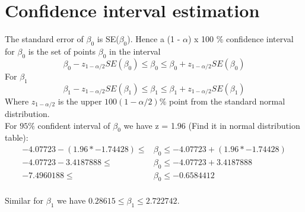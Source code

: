 \documentclass{article}
\begin{document}
    
\section {Confidence interval estimation}
    The standard error of $\beta_{0}$ is SE($\beta_{0}$). Hence a (1 - $\alpha$) x 100 $\%$ confidence interval for $\beta_{0}$  is the set of points $\beta_{0}$ in the interval
    \begin{equation} 
        \beta_{0} - z_{1 - \alpha/2}SE(\beta_{0}) \le \beta_{0} \le \beta_{0} + z_{1 - \alpha/2}SE(\beta_{0})
    \end{equation}
    For $\beta_{1}$
    \begin{equation} 
        \beta_{1} - z_{1 - \alpha/2}SE(\beta_{1}) \le \beta_{1} \le \beta_{1} + z_{1 - \alpha/2}SE(\beta_{1})
    \end{equation}
    Where $z_{1 - \alpha / 2}$ is the upper $100 \left(1 - \alpha / 2 \right)\%$ point from the standard normal distribution. 
    \\
    For $95\%$ confident interval of $\beta_{0}$ we have z = 1.96 (Find it in normal distribution table): 
    \begin{align} 
        -4.07723 - (1.96 * -1.74428) \le&\beta_{0}\le -4.07723 + (1.96 * -1.74428)
        \nonumber \\
        -4.07723 - 3.4187888 \le&\beta_{0}\le -4.07723 + 3.4187888
        \nonumber \\
        -7.4960188 \le&\beta_{0}\le -0.6584412 \nonumber \\
    \end{align}
    
    Similar for $\beta_{1}$ we have $0.28615 \le \beta_{1} \le 2.722742$.
    
\end{document}
